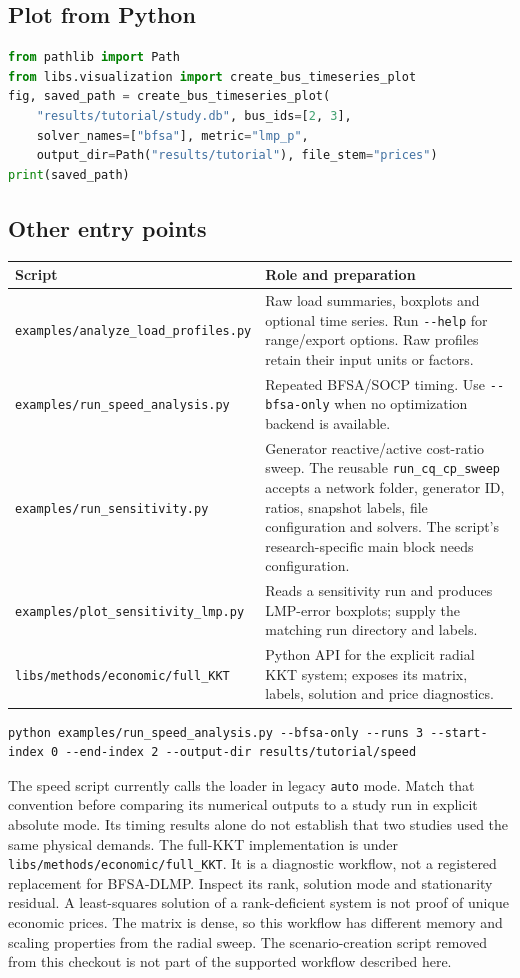 \documentclass[11pt,a4paper]{article}
\newcommand{\code}[1]{\nolinkurl{#1}}
\begin{document}
\subsection{Plot from Python}
\begin{lstlisting}[language=Python]
from pathlib import Path
from libs.visualization import create_bus_timeseries_plot
fig, saved_path = create_bus_timeseries_plot(
    "results/tutorial/study.db", bus_ids=[2, 3],
    solver_names=["bfsa"], metric="lmp_p",
    output_dir=Path("results/tutorial"), file_stem="prices")
print(saved_path)
\end{lstlisting}
\subsection{Other entry points}
\begin{longtable}{p{.40\linewidth}p{.52\linewidth}}
\toprule Script & Role and preparation \\\midrule\endhead
\code{examples/analyze_load_profiles.py} & Raw load summaries, boxplots and optional time series. Run \code{--help} for range/export options. Raw profiles retain their input units or factors.\\
\code{examples/run_speed_analysis.py} & Repeated BFSA/SOCP timing. Use \code{--bfsa-only} when no optimization backend is available.\\
\code{examples/run_sensitivity.py} & Generator reactive/active cost-ratio sweep. The reusable \code{run_cq_cp_sweep} accepts a network folder, generator ID, ratios, snapshot labels, file configuration and solvers. The script's research-specific main block needs configuration.\\
\code{examples/plot_sensitivity_lmp.py} & Reads a sensitivity run and produces LMP-error boxplots; supply the matching run directory and labels.\\
\code{libs/methods/economic/full_KKT} & Python API for the explicit radial KKT system; exposes its matrix, labels, solution and price diagnostics.\\
\bottomrule
\end{longtable}
\begin{lstlisting}
python examples/run_speed_analysis.py --bfsa-only --runs 3 --start-index 0 --end-index 2 --output-dir results/tutorial/speed
\end{lstlisting}
The speed script currently calls the loader in legacy \code{auto} mode.
Match that convention before comparing its numerical outputs to a study run
in explicit absolute mode. Its timing results alone do not establish that
two studies used the same physical demands.
The full-KKT implementation is under \code{libs/methods/economic/full_KKT}.
It is a diagnostic workflow, not a registered replacement for BFSA-DLMP.
Inspect its rank, solution mode and stationarity residual. A least-squares
solution of a rank-deficient system is not proof of unique economic prices.
The matrix is dense, so this workflow has different memory and scaling
properties from the radial sweep. The scenario-creation script removed from
this checkout is not part of the supported workflow described here.
\end{document}
